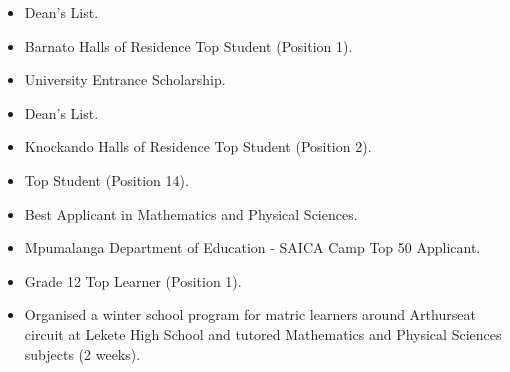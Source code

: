 \documentclass[10pt,a4paper,ragged2e]{altacv}
\begin{document}





\begin{itemize}
\item Dean's List.
\item Barnato Halls of Residence Top Student (Position 1).
\end{itemize}

\begin{itemize}
\item University Entrance Scholarship.
\item Dean's List.
\item Knockando Halls of Residence Top Student (Position 2).
\end{itemize}


\begin{itemize}
\item Top Student (Position 14).
\item Best Applicant in Mathematics and Physical Sciences.
\end{itemize}


\begin{itemize}
\item Mpumalanga Department of Education - SAICA Camp Top 50 Applicant.
\item Grade 12 Top Learner (Position 1).
\end{itemize}


\clearpage

\begin{itemize}
%

\item Organised a winter school program for matric learners around Arthurseat circuit at Lekete High School and tutored Mathematics and Physical Sciences subjects (2 weeks).

\end{itemize}
\end{document}
